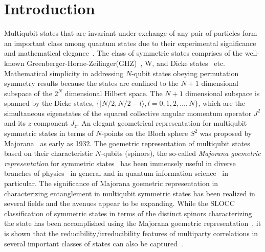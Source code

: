 \documentclass[pra,preprint,a4paper,superscriptaddress]{revtex4}
\begin{document}
\maketitle
\section{Introduction}
\label{intro}
Multiqubit states that are invariant under exchange of any pair of particles form an important class among quantum states due to their experimental significance and mathematical elegance~\cite{sym1,sym1a,sym1b,sym2,sym3}. The class of symmetric states comprises of the well-known Greenberger-Horne-Zeilinger(GHZ)~\cite{ghz}, W, and Dicke states~\cite{dicke} etc. Mathematical simplicity in addressing 
$N$-qubit  states obeying permutation symmetry results because the states are confined to the $N+1$ dimensional subspace of the $2^N$ dimensional Hilbert space. The $N+1$ dimensional subspace is spanned by the Dicke states, $\{\vert N/2, N/2-l\rangle,  l=0,1,2,\ldots,N\}$, which are the simultaneous eigenstates of the squared collective angular momentum operator $J^2$ and its $z$-component $J_z$. An elegant geometrical representation for  multiqubit symmetric states in terms of $N$-points on the Bloch sphere $S^2$ was proposed by Majorana~\cite{majorana} as early as 1932. The goemetric representation of multiqubit states based on their characteristic $N$-qubits (spinors), the so-called {\em Majorana goemetric representation} for symmetric states~\cite{majorana,1945,makela} has been  immensely useful in diverse branches of physics~\cite{1945,jpa4,arxiv4,jpa5,ejtp6} in general and in quantum information science~\cite{solano, mixed, usa, usa1,usa2,markham1,markham2,gebastin,markham3} in particular.  The significance of Majorana goemetric representation in characterizing entanglement in multiqubit symmetric states has been realized in several fields and the avenues appear to be expanding. While the SLOCC classification of symmetric states in terms of the distinct spinors characterizing the state has been accomplished using the Majorana goemetric representation~\cite{solano, mixed}, it is shown that the reducibility/irreducibility features of multiparty correlations in several important classes of states can also be captured~\cite{usa1,usa2,usa}. 
\end{document}
